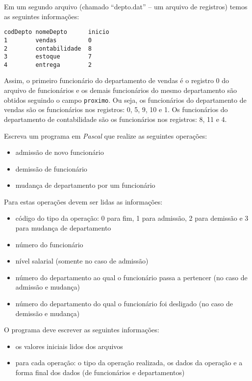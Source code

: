 \begin{enumerate}
Em um segundo arquivo (chamado ``depto.dat'' -- um arquivo de registros)
temos as seguintes informações:

\begin{verbatim}
codDepto nomeDepto      inicio
1        vendas         0
2        contabilidade  8
3        estoque        7
4        entrega        2
\end{verbatim}

Assim, o primeiro funcionário do departamento de vendas é o registro 0 do
arquivo de funcionários e os demais funcionários do mesmo departamento são
obtidos seguindo o campo {\tt proximo}.  Ou seja, os funcionários do
departamento de vendas são os funcionários nos registros: 0, 5, 9, 10 e 1.
Os funcionários do departamento de contabilidade são os funcionários nos
registros: 8, 11 e 4.

Escreva um programa em \emph{Pascal} que realize as seguintes operações:
\begin{itemize}
\item admissão de novo funcionário
\item demissão de funcionário
\item mudança de departamento por um funcionário
\end{itemize} 

Para estas operações devem ser lidas as informações:
\begin{itemize}
\item código do tipo da operação: 0 para fim, 1 para admissão, 2 para
  demissão e 3 para mudança de departamento
\item número do funcionário
\item nível salarial (somente no caso de admissão)
\item número do departamento ao qual o funcionário passa a pertencer (no
  caso de admissão e mudança)
\item número do departamento do qual o funcionário foi desligado (no caso
  de demissão e mudança)
\end{itemize}



O programa deve escrever as seguintes informações:
\begin{itemize}
\item os valores iniciais lidos dos arquivos
\item para cada operação: o tipo da operação realizada, os dados da
operação e a forma final dos dados (de funcionários e departamentos)
\end{itemize}


\end{enumerate}
